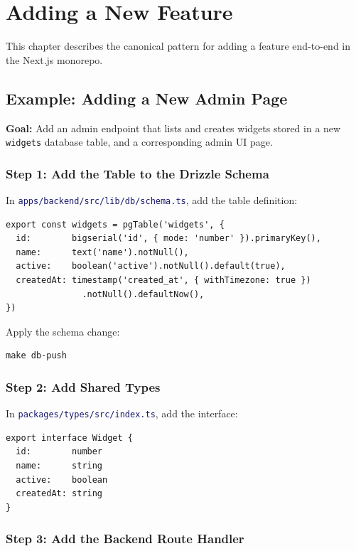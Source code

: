 \documentclass[12pt,a4paper,twoside]{report}
\newcommand{\code}[1]{\texttt{#1}}
\newcommand{\file}[1]{\texttt{\textcolor{MidnightBlue}{#1}}}
\begin{document}
\chapter{Adding a New Feature}
\label{ch:new-feature}

This chapter describes the canonical pattern for adding a feature end-to-end
in the Next.js monorepo.

\section{Example: Adding a New Admin Page}

\textbf{Goal:} Add an admin endpoint that lists and creates widgets stored
in a new \code{widgets} database table, and a corresponding admin UI page.

\subsection{Step 1: Add the Table to the Drizzle Schema}

In \file{apps/backend/src/lib/db/schema.ts}, add the table definition:

\begin{lstlisting}[style=typescript]
export const widgets = pgTable('widgets', {
  id:        bigserial('id', { mode: 'number' }).primaryKey(),
  name:      text('name').notNull(),
  active:    boolean('active').notNull().default(true),
  createdAt: timestamp('created_at', { withTimezone: true })
               .notNull().defaultNow(),
})
\end{lstlisting}

Apply the schema change:
\begin{lstlisting}[style=bash]
make db-push
\end{lstlisting}

\subsection{Step 2: Add Shared Types}

In \file{packages/types/src/index.ts}, add the interface:

\begin{lstlisting}[style=typescript]
export interface Widget {
  id:        number
  name:      string
  active:    boolean
  createdAt: string
}
\end{lstlisting}

\subsection{Step 3: Add the Backend Route Handler}
\end{document}
